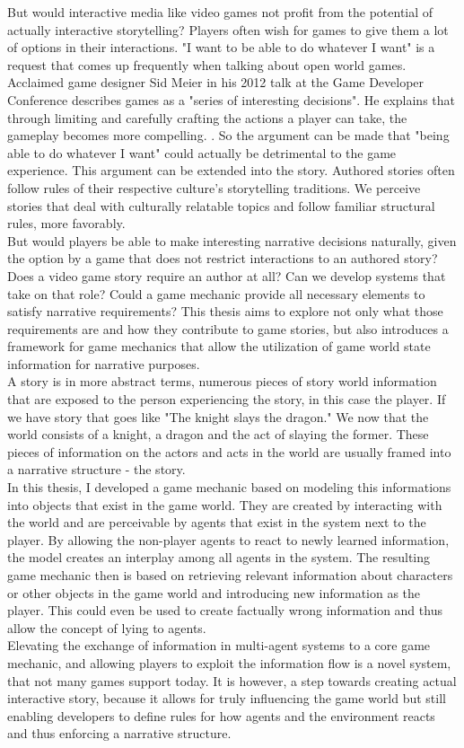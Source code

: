 But would interactive media like video games not profit from the potential of actually interactive storytelling? Players often wish for games to give them a lot of options in their interactions. "I want to be able to do whatever I want" is a request that comes up frequently when talking about open world games. Acclaimed game designer Sid Meier in his 2012 talk at the Game Developer Conference describes games as a "series of interesting decisions". He explains that through limiting and carefully crafting the actions a player can take, the gameplay becomes more compelling. \cite{Dring2018}. So the argument can be made that "being able to do whatever I want" could actually be detrimental to the game experience. This argument can be extended into the story. Authored stories often follow rules of their respective culture's storytelling traditions. We perceive stories that deal with culturally relatable topics and follow familiar structural rules, more favorably. \cite{Cooney2017}\\
But would players be able to make interesting narrative decisions naturally, given the option by a game that does not restrict interactions to an authored story? Does a video game story require an author at all? Can we  develop systems that take on that role? Could a game mechanic provide all necessary elements to satisfy narrative requirements? This thesis aims to explore not only what those requirements are and how they contribute to game stories, but also introduces a framework for game mechanics that allow the utilization of game world state information for narrative purposes.\\
A story is in more abstract terms, numerous pieces of story world information that are exposed to the person experiencing the story, in this case the player. If we have story that goes like "The knight slays the dragon." We now that the world consists of a knight, a dragon and the act of slaying the former. These pieces of information on the actors and acts in the world are usually framed into a narrative structure - the story.\\
In this thesis, I developed a game mechanic based on modeling this informations into objects that exist in the game world. They are created by interacting with the world and are perceivable by agents that exist in the system next to the player. By allowing the non-player agents to react to newly learned information, the model creates an interplay among all agents in the system. The resulting game mechanic then is based on retrieving relevant information about characters or other objects in the game world and introducing new information as the player. This could even be used to create factually wrong information and thus allow the concept of lying to agents.\\
Elevating the exchange of information in multi-agent systems to a core game mechanic, and allowing players to exploit the information flow is a novel system, that not many games support today. It is however, a step towards creating actual interactive story, because it allows for truly influencing the game world but still enabling developers to define rules for how agents and the environment reacts and thus enforcing a narrative structure.